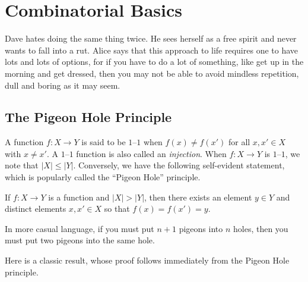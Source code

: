 
\chapter{Combinatorial Basics}\label{ch:basics}

Dave hates doing the same thing twice.  He sees herself
as a free spirit and never wants to fall into a rut.  Alice
says that this approach to life requires one to have lots
and lots of options, for if you have to do a lot of something,
like get up in the morning and get dressed, then you may not
be able to avoid mindless repetition, dull and boring as it
may seem.

\section{The Pigeon Hole Principle}

A function $f:X\longrightarrow Y$ is said to be $1$--$1$ when
$f(x)\neq f(x')$ for all $x,x'\in X$ with $x\neq x'$.  A $1$--$1$
function is also called an \textit{injection}.  When
$f:X\longrightarrow Y$ is $1$--$1$, we note that $|X|\le |Y|$.
Conversely, we have the following self-evident statement, which is
popularly called the ``Pigeon Hole'' principle.

\begin{proposition}\label{prop:pigeon}
If $f:X\longrightarrow Y$ is a function and $|X|>|Y|$, then
there exists an element $y\in Y$ and distinct elements $x,x'\in X$
so that $f(x)=f(x')=y$.
\end{proposition}

In more casual language, if you must put $n+1$ pigeons into $n$ holes,
then you must put two pigeons into the same hole.

Here is a classic result, whose proof follows immediately from
the Pigeon Hole principle.

